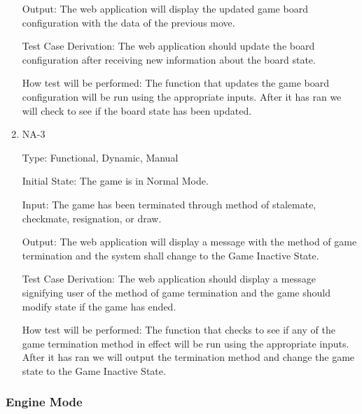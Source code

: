 \documentclass[12pt, titlepage]{article}
\begin{document}
\begin{enumerate}
    Output: The web application will display the updated game board configuration with the data
    of the previous move.
                        
    Test Case Derivation: The web application should update the board configuration after receiving new information about the board state. 

    How test will be performed: The function that updates the game board configuration
    will be run using the appropriate inputs. After it has ran we will check to see if the board state has been updated.

    \item{NA-3\\}

    Type: Functional, Dynamic, Manual
                      
    Initial State: The game is in Normal Mode.
                        
    Input: The game has been terminated through method of stalemate, checkmate, resignation, or draw.
                        
    Output: The web application will display a message with the method of game termination and the
    system shall change to the Game Inactive State.
                        
    Test Case Derivation: The web application should display a message signifying user of the method of game termination
    and the game should modify state if the game has ended.

    How test will be performed: The function that checks to see if any of the game termination method in effect
    will be run using the appropriate inputs. After it has ran we will output the termination method and change the
    game state to the Game Inactive State.

  \end{enumerate}

  \subsubsection{Engine Mode}
\end{document}
